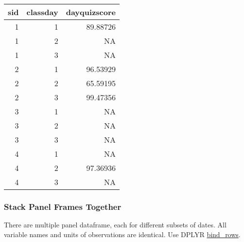 \documentclass[
]{book}
\newenvironment{Shaded}{\begin{snugshade}}{\end{snugshade}}
\newcommand{\KeywordTok}[1]{\textcolor[rgb]{0.13,0.29,0.53}{\textbf{#1}}}
\newcommand{\NormalTok}[1]{#1}
\newcommand{\OperatorTok}[1]{\textcolor[rgb]{0.81,0.36,0.00}{\textbf{#1}}}
\newcommand{\StringTok}[1]{\textcolor[rgb]{0.31,0.60,0.02}{#1}}
\begin{document}
\begin{Shaded}
\end{Shaded}

\begin{table}[!h]
\centering
\begin{tabular}{r|r|r}
\hline
sid & classday & dayquizscore\\
\hline
\rowcolor{gray!6}  1 & 1 & 89.88726\\
\hline
1 & 2 & NA\\
\hline
\rowcolor{gray!6}  1 & 3 & NA\\
\hline
2 & 1 & 96.53929\\
\hline
\rowcolor{gray!6}  2 & 2 & 65.59195\\
\hline
2 & 3 & 99.47356\\
\hline
\rowcolor{gray!6}  3 & 1 & NA\\
\hline
3 & 2 & NA\\
\hline
\rowcolor{gray!6}  3 & 3 & NA\\
\hline
4 & 1 & NA\\
\hline
\rowcolor{gray!6}  4 & 2 & 97.36936\\
\hline
4 & 3 & NA\\
\hline
\end{tabular}
\end{table}

\hypertarget{stack-panel-frames-together}{%
\subsubsection{Stack Panel Frames Together}\label{stack-panel-frames-together}}

There are multiple panel dataframe, each for different subsets of dates. All variable names and units of observations are identical. Use DPLYR \href{https://dplyr.tidyverse.org/reference/bind.html}{bind\_rows}.
\end{document}

